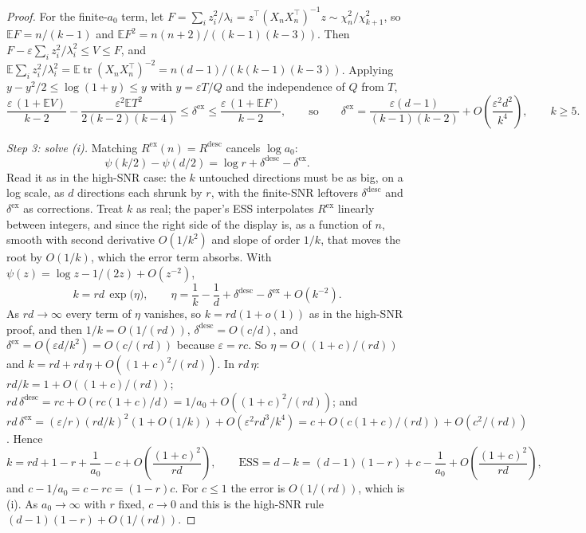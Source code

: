 \documentclass[10pt]{article}
\newcommand{\ess}{\mathrm{ESS}}
\newcommand{\E}{\mathbb{E}}
\begin{document}
\begin{proof}
For the finite-$a_0$ term, let $F = \sum_i z_i^2 / \lambda_i = z^\top (X_n X_n^\top)^{-1} z \sim \chi^2_n / \chi^2_{k+1}$, so $\E F = n/(k-1)$ and $\E F^2 = n(n+2)/((k-1)(k-3))$. Then $F - \varepsilon \sum_i z_i^2/\lambda_i^2 \le V \le F$, and $\E \sum_i z_i^2/\lambda_i^2 = \E \operatorname{tr}(X_n X_n^\top)^{-2} = n(d-1)/(k(k-1)(k-3))$. Applying $y - y^2/2 \le \log(1+y) \le y$ with $y = \varepsilon T / Q$ and the independence of $Q$ from $T$,
\[
\frac{\varepsilon\,(1 + \E V)}{k-2} - \frac{\varepsilon^2 \E T^2}{2(k-2)(k-4)} \le \delta^{\mathrm{ex}} \le \frac{\varepsilon\,(1 + \E F)}{k-2},
\qquad\text{so}\qquad
\delta^{\mathrm{ex}} = \frac{\varepsilon (d-1)}{(k-1)(k-2)} + O\!\left(\frac{\varepsilon^2 d^2}{k^4}\right), \qquad k \ge 5 .
\]

\emph{Step 3: solve (i).} Matching $R^{\mathrm{ex}}(n) = R^{\mathrm{desc}}$ cancels $\log a_0$:
\[
\psi(k/2) - \psi(d/2) = \log r + \delta^{\mathrm{desc}} - \delta^{\mathrm{ex}} .
\]
Read it as in the high-SNR case: the $k$ untouched directions must be as big, on a log scale, as $d$ directions each shrunk by $r$, with the finite-SNR leftovers $\delta^{\mathrm{desc}}$ and $\delta^{\mathrm{ex}}$ as corrections. Treat $k$ as real; the paper's ESS interpolates $R^{\mathrm{ex}}$ linearly between integers, and since the right side of the display is, as a function of $n$, smooth with second derivative $O(1/k^2)$ and slope of order $1/k$, that moves the root by $O(1/k)$, which the error term absorbs. With $\psi(z) = \log z - 1/(2z) + O(z^{-2})$,
\[
k = rd \, \exp\!\big(\eta\big), \qquad \eta = \frac1k - \frac1d + \delta^{\mathrm{desc}} - \delta^{\mathrm{ex}} + O(k^{-2}) .
\]
As $rd \to \infty$ every term of $\eta$ vanishes, so $k = rd(1 + o(1))$ as in the high-SNR proof, and then $1/k = O(1/(rd))$, $\delta^{\mathrm{desc}} = O(c/d)$, and $\delta^{\mathrm{ex}} = O(\varepsilon d / k^2) = O(c/(rd))$ because $\varepsilon = rc$. So $\eta = O((1+c)/(rd))$ and $k = rd + rd\,\eta + O((1+c)^2/(rd))$. In $rd\,\eta$: $rd/k = 1 + O((1+c)/(rd))$; $rd\,\delta^{\mathrm{desc}} = rc + O(rc(1+c)/d) = 1/a_0 + O((1+c)^2/(rd))$; and $rd\,\delta^{\mathrm{ex}} = (\varepsilon/r)(rd/k)^2(1 + O(1/k)) + O(\varepsilon^2 r d^3/k^4) = c + O(c(1+c)/(rd)) + O(c^2/(rd))$. Hence
\[
k = rd + 1 - r + \frac{1}{a_0} - c + O\!\left(\frac{(1+c)^2}{rd}\right),
\qquad
\ess = d - k = (d-1)(1-r) + c - \frac{1}{a_0} + O\!\left(\frac{(1+c)^2}{rd}\right),
\]
and $c - 1/a_0 = c - rc = (1-r)c$. For $c \le 1$ the error is $O(1/(rd))$, which is (i). As $a_0 \to \infty$ with $r$ fixed, $c \to 0$ and this is the high-SNR rule $(d-1)(1-r) + O(1/(rd))$.


\end{proof}
\end{document}
